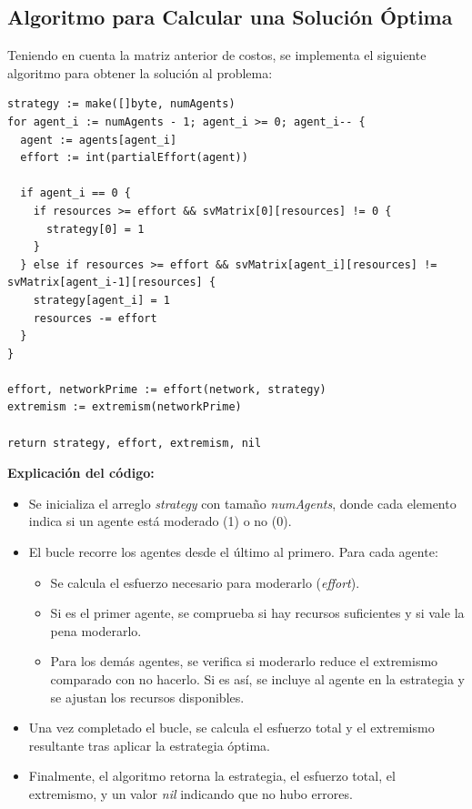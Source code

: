 \documentclass[letterpaper,10pt]{article}
\begin{document}
\subsection{Algoritmo para Calcular una Solución Óptima}
\label{subsec:algoritmo_solucion_optima}
Teniendo en cuenta la matriz anterior de costos, se implementa el siguiente algoritmo para obtener la solución al problema:
\begin{lstlisting}[caption={Reconstruct Strategy $\rightarrow$Extracción del algoritmo ModexPD}, label={lst:modexpd_extraccion2}]
strategy := make([]byte, numAgents)
for agent_i := numAgents - 1; agent_i >= 0; agent_i-- {
  agent := agents[agent_i]
  effort := int(partialEffort(agent))

  if agent_i == 0 {
    if resources >= effort && svMatrix[0][resources] != 0 {
      strategy[0] = 1
    }
  } else if resources >= effort && svMatrix[agent_i][resources] != svMatrix[agent_i-1][resources] {
    strategy[agent_i] = 1
    resources -= effort
  }
}

effort, networkPrime := effort(network, strategy)
extremism := extremism(networkPrime)

return strategy, effort, extremism, nil
\end{lstlisting}
\textbf{Explicación del código:}
\begin{itemize}
  \item Se inicializa el arreglo \textit{strategy} con tamaño \textit{numAgents}, donde cada elemento indica si un agente está moderado (1) o no (0).

  \item El bucle recorre los agentes desde el último al primero. Para cada agente:
  \begin{itemize}
    \item Se calcula el esfuerzo necesario para moderarlo (\textit{effort}).
    \item Si es el primer agente, se comprueba si hay recursos suficientes y si vale la pena moderarlo.
    \item Para los demás agentes, se verifica si moderarlo reduce el extremismo comparado con no hacerlo. Si es así, se incluye al agente en la estrategia y se ajustan los recursos disponibles.
  \end{itemize}

  \item Una vez completado el bucle, se calcula el esfuerzo total y el extremismo resultante tras aplicar la estrategia óptima.

  \item Finalmente, el algoritmo retorna la estrategia, el esfuerzo total, el extremismo, y un valor \textit{nil} indicando que no hubo errores.
\end{itemize}
\end{document}
